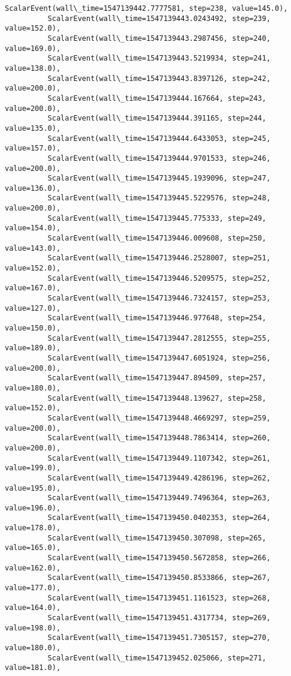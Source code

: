 \documentclass[11pt]{article}
\begin{document}
\begin{Verbatim}[commandchars=\\\{\}]
          ScalarEvent(wall\_time=1547139442.7777581, step=238, value=145.0),
          ScalarEvent(wall\_time=1547139443.0243492, step=239, value=152.0),
          ScalarEvent(wall\_time=1547139443.2987456, step=240, value=169.0),
          ScalarEvent(wall\_time=1547139443.5219934, step=241, value=138.0),
          ScalarEvent(wall\_time=1547139443.8397126, step=242, value=200.0),
          ScalarEvent(wall\_time=1547139444.167664, step=243, value=200.0),
          ScalarEvent(wall\_time=1547139444.391165, step=244, value=135.0),
          ScalarEvent(wall\_time=1547139444.6433053, step=245, value=157.0),
          ScalarEvent(wall\_time=1547139444.9701533, step=246, value=200.0),
          ScalarEvent(wall\_time=1547139445.1939096, step=247, value=136.0),
          ScalarEvent(wall\_time=1547139445.5229576, step=248, value=200.0),
          ScalarEvent(wall\_time=1547139445.775333, step=249, value=154.0),
          ScalarEvent(wall\_time=1547139446.009608, step=250, value=143.0),
          ScalarEvent(wall\_time=1547139446.2528007, step=251, value=152.0),
          ScalarEvent(wall\_time=1547139446.5209575, step=252, value=167.0),
          ScalarEvent(wall\_time=1547139446.7324157, step=253, value=127.0),
          ScalarEvent(wall\_time=1547139446.977648, step=254, value=150.0),
          ScalarEvent(wall\_time=1547139447.2812555, step=255, value=189.0),
          ScalarEvent(wall\_time=1547139447.6051924, step=256, value=200.0),
          ScalarEvent(wall\_time=1547139447.894509, step=257, value=180.0),
          ScalarEvent(wall\_time=1547139448.139627, step=258, value=152.0),
          ScalarEvent(wall\_time=1547139448.4669297, step=259, value=200.0),
          ScalarEvent(wall\_time=1547139448.7863414, step=260, value=200.0),
          ScalarEvent(wall\_time=1547139449.1107342, step=261, value=199.0),
          ScalarEvent(wall\_time=1547139449.4286196, step=262, value=195.0),
          ScalarEvent(wall\_time=1547139449.7496364, step=263, value=196.0),
          ScalarEvent(wall\_time=1547139450.0402353, step=264, value=178.0),
          ScalarEvent(wall\_time=1547139450.307098, step=265, value=165.0),
          ScalarEvent(wall\_time=1547139450.5672858, step=266, value=162.0),
          ScalarEvent(wall\_time=1547139450.8533866, step=267, value=177.0),
          ScalarEvent(wall\_time=1547139451.1161523, step=268, value=164.0),
          ScalarEvent(wall\_time=1547139451.4317734, step=269, value=198.0),
          ScalarEvent(wall\_time=1547139451.7305157, step=270, value=180.0),
          ScalarEvent(wall\_time=1547139452.025066, step=271, value=181.0),

\end{Verbatim}
\end{document}
